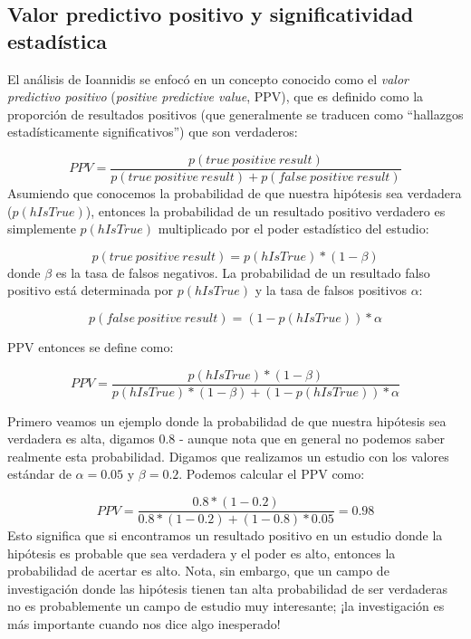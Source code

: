 \documentclass[
  12pt,
]{book}
\begin{document}
\hypertarget{valor-predictivo-positivo-y-significatividad-estaduxedstica}{%
\subsection{Valor predictivo positivo y significatividad estadística}\label{valor-predictivo-positivo-y-significatividad-estaduxedstica}}

El análisis de Ioannidis se enfocó en un concepto conocido como el \emph{valor predictivo positivo} (\emph{positive predictive value}, PPV), que es definido como la proporción de resultados positivos (que generalmente se traducen como ``hallazgos estadísticamente significativos'') que son verdaderos:

\[
PPV = \frac{p(true\ positive\ result)}{p(true\ positive\ result) + p(false\ positive\ result)}
\]
Asumiendo que conocemos la probabilidad de que nuestra hipótesis sea verdadera (\(p(hIsTrue)\)), entonces la probabilidad de un resultado positivo verdadero es simplemente \(p(hIsTrue)\) multiplicado por el poder estadístico del estudio:

\[
p(true\ positive\ result) = p(hIsTrue) * (1 - \beta)
\]
donde \(\beta\) es la tasa de falsos negativos. La probabilidad de un resultado falso positivo está determinada por \(p(hIsTrue)\) y la tasa de falsos positivos \(\alpha\):

\[
p(false\ positive\ result) = (1 - p(hIsTrue)) * \alpha
\]

PPV entonces se define como:

\[
PPV = \frac{p(hIsTrue) * (1 - \beta)}{p(hIsTrue) * (1 - \beta) + (1 - p(hIsTrue)) * \alpha}
\]

Primero veamos un ejemplo donde la probabilidad de que nuestra hipótesis sea verdadera es alta, digamos 0.8 - aunque nota que en general no podemos saber realmente esta probabilidad. Digamos que realizamos un estudio con los valores estándar de \(\alpha=0.05\) y \(\beta=0.2\). Podemos calcular el PPV como:

\[
PPV = \frac{0.8 * (1 - 0.2)}{0.8 * (1 - 0.2) + (1 - 0.8) * 0.05} = 0.98
\]
Esto significa que si encontramos un resultado positivo en un estudio donde la hipótesis es probable que sea verdadera y el poder es alto, entonces la probabilidad de acertar es alto. Nota, sin embargo, que un campo de investigación donde las hipótesis tienen tan alta probabilidad de ser verdaderas no es probablemente un campo de estudio muy interesante; ¡la investigación es más importante cuando nos dice algo inesperado!
\end{document}
